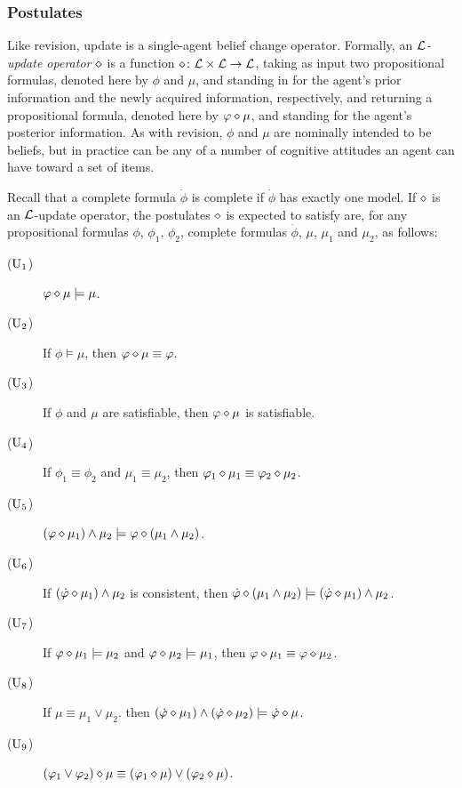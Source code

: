 
\subsubsection{Postulates}
Like revision, update is a single-agent belief change operator.
Formally, an \emph{$\mathcal{L}$-update operator $\diamond$} 
is a function $\diamond\colon\mathcal{L}\times\mathcal{L}\rightarrow\mathcal{L}$,
taking as input 
two propositional formulas, 
denoted here by $\phi$ and $\mu$,
and standing in for the agent's prior information and the newly acquired 
information, respectively,
and returning a propositional formula,
denoted here by $\varphi\diamond\mu$,
and standing for the agent's posterior information.
As with revision, $\phi$ and $\mu$ are nominally intended to be beliefs,
but in practice can be any of a number of cognitive attitudes an agent
can have toward a set of items.

Recall that a complete formula $\dot{\phi}$ is complete 
if $\dot{\phi}$ has exactly one model.
If $\diamond$ is an $\mathcal{L}$-update operator, 
the postulates $\diamond$ is expected to satisfy are, 
for any propositional formulas $\phi$, $\phi_{1}$, $\phi_{2}$,
complete formulas $\dot{\phi}$,
$\mu$, $\mu_{1}$ and $\mu_{2}$,
as follows:

\begin{description}
	\item[($\mathrm{U}_{1}$)] $\varphi\diamond\mu\models\mu$.
	
	\item[($\mathrm{U}_{2}$)] If $\phi\models\mu$, then $\varphi\diamond\mu\equiv\varphi$.
	
	\item[($\mathrm{U}_{3}$)] If $\phi$ and $\mu$ are satisfiable, then $\varphi\diamond\mu$ is satisfiable.
	
	\item[($\mathrm{U}_{4}$)] If $\phi_1\equiv\phi_2$ and $\mu_1\equiv\mu_2$, 
		then $\varphi_1\diamond\mu_1\equiv\varphi_2\diamond\mu_2$.
	
	\item[($\mathrm{U}_{5}$)] $(\varphi\diamond\mu_1)\land\mu_2\models\varphi\diamond(\mu_1\land\mu_2)$.
	
	\item[($\mathrm{U}_{6}$)] If $(\dot{\varphi}\diamond\mu_1)\land\mu_2$ is consistent, 
		then $\dot{\varphi}\diamond(\mu_1\land\mu_2)\models(\dot{\varphi}\diamond\mu_1)\land\mu_2$.

	\item[($\mathrm{U}_{7}$)] If $\varphi\diamond\mu_1\models\mu_2$ and $\varphi\diamond\mu_2\models\mu_1$, 
		then $\varphi\diamond\mu_1\equiv\varphi\diamond\mu_2$.
	
	\item[($\mathrm{U}_{8}$)] If $\mu\equiv \mu_{1}\lor\mu_{2}$.
		then $(\dot{\varphi}\diamond\mu_1)\land(\dot{\varphi}\diamond\mu_2)\models\dot{\varphi}\diamond\mu$.
	
	\item[($\mathrm{U}_{9}$)] $(\varphi_{1}\lor\varphi_{2})\diamond\mu\equiv(\varphi_1\diamond\mu)\lor(\varphi_2\diamond\mu)$.
\end{description}

